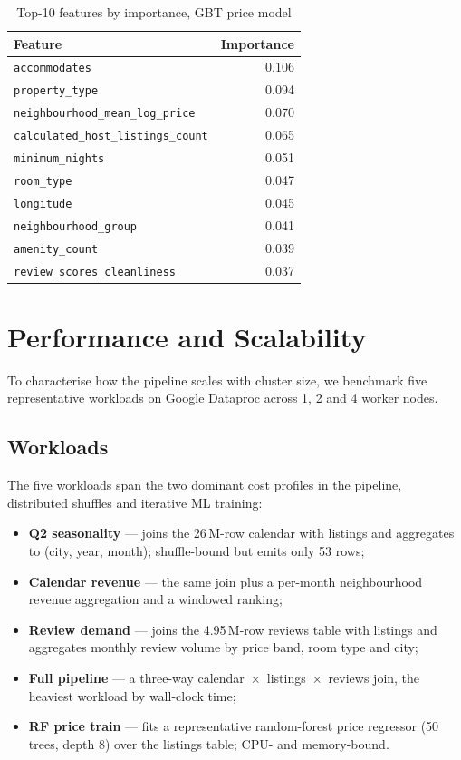 \documentclass[conference]{IEEEtran}
\begin{document}
\begin{table}[H]
\caption{Top-10 features by importance, GBT price model}
\label{tab:importance}
\centering
\begin{tabular}{lr}
\toprule
\textbf{Feature} & \textbf{Importance} \\
\midrule
\texttt{accommodates}                         & 0.106 \\
\texttt{property\_type}                       & 0.094 \\
\texttt{neighbourhood\_mean\_log\_price}      & 0.070 \\
\texttt{calculated\_host\_listings\_count}    & 0.065 \\
\texttt{minimum\_nights}                      & 0.051 \\
\texttt{room\_type}                           & 0.047 \\
\texttt{longitude}                            & 0.045 \\
\texttt{neighbourhood\_group}                 & 0.041 \\
\texttt{amenity\_count}                       & 0.039 \\
\texttt{review\_scores\_cleanliness}          & 0.037 \\
\bottomrule
\end{tabular}
\end{table}

\section{Performance and Scalability}
\label{sec:perf}

To characterise how the pipeline scales with cluster size, we benchmark five representative workloads on Google Dataproc across 1, 2 and 4 worker nodes.

\subsection{Workloads}
The five workloads span the two dominant cost profiles in the pipeline, distributed shuffles and iterative ML training:
\begin{itemize}
  \item \textbf{Q2 seasonality} --- joins the 26\,M-row calendar with listings and aggregates to (city, year, month); shuffle-bound but emits only 53 rows;
  \item \textbf{Calendar revenue} --- the same join plus a per-month neighbourhood revenue aggregation and a windowed ranking;
  \item \textbf{Review demand} --- joins the 4.95\,M-row reviews table with listings and aggregates monthly review volume by price band, room type and city;
  \item \textbf{Full pipeline} --- a three-way calendar~$\times$~listings~$\times$~reviews join, the heaviest workload by wall-clock time;
  \item \textbf{RF price train} --- fits a representative random-forest price regressor (50 trees, depth 8) over the listings table; CPU- and memory-bound.
\end{itemize}
\end{document}
